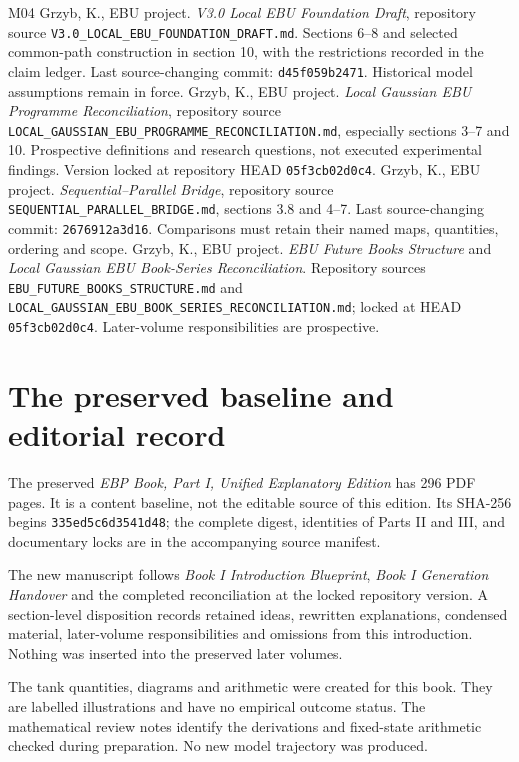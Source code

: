 \begin{thebibliography}{M04}
 Grzyb, K., EBU project. \textit{V3.0 Local EBU Foundation Draft}, repository source \nolinkurl{V3.0_LOCAL_EBU_FOUNDATION_DRAFT.md}. Sections 6--8 and selected common-path construction in section 10, with the restrictions recorded in the claim ledger. Last source-changing commit: \texttt{d45f059b2471}. Historical model assumptions remain in force.
 Grzyb, K., EBU project. \textit{Local Gaussian EBU Programme Reconciliation}, repository source \nolinkurl{LOCAL_GAUSSIAN_EBU_PROGRAMME_RECONCILIATION.md}, especially sections 3--7 and 10. Prospective definitions and research questions, not executed experimental findings. Version locked at repository HEAD \texttt{05f3cb02d0c4}.
 Grzyb, K., EBU project. \textit{Sequential--Parallel Bridge}, repository source \nolinkurl{SEQUENTIAL_PARALLEL_BRIDGE.md}, sections 3.8 and 4--7. Last source-changing commit: \texttt{2676912a3d16}. Comparisons must retain their named maps, quantities, ordering and scope.
 Grzyb, K., EBU project. \textit{EBU Future Books Structure} and \textit{Local Gaussian EBU Book-Series Reconciliation}. Repository sources \nolinkurl{EBU_FUTURE_BOOKS_STRUCTURE.md} and \nolinkurl{LOCAL_GAUSSIAN_EBU_BOOK_SERIES_RECONCILIATION.md}; locked at HEAD \texttt{05f3cb02d0c4}. Later-volume responsibilities are prospective.
\end{thebibliography}
\endgroup

\section*{The preserved baseline and editorial record}
The preserved \textit{EBP Book, Part I, Unified Explanatory Edition} has 296 PDF pages. It is a content baseline, not the editable source of this edition. Its SHA-256 begins \texttt{335ed5c6d3541d48}; the complete digest, identities of Parts II and III, and documentary locks are in the accompanying source manifest.

The new manuscript follows \textit{Book I Introduction Blueprint}, \textit{Book I Generation Handover} and the completed reconciliation at the locked repository version. A section-level disposition records retained ideas, rewritten explanations, condensed material, later-volume responsibilities and omissions from this introduction. Nothing was inserted into the preserved later volumes.

The tank quantities, diagrams and arithmetic were created for this book. They are labelled illustrations and have no empirical outcome status. The mathematical review notes identify the derivations and fixed-state arithmetic checked during preparation. No new model trajectory was produced.
